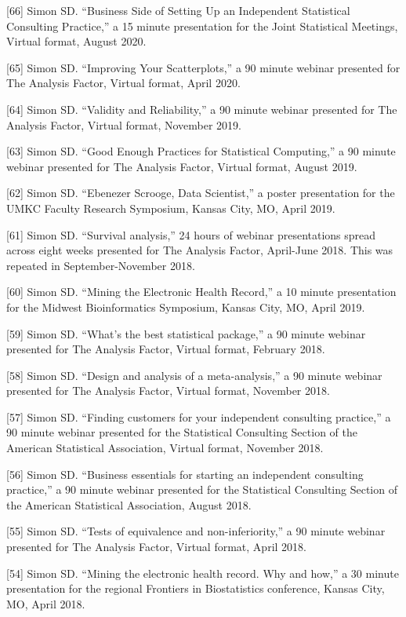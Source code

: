 \documentclass[
  12pt,
]{article}
\begin{document}
{[}66{]} Simon SD. ``Business Side of Setting Up an Independent
Statistical Consulting Practice,'' a 15 minute presentation for the
Joint Statistical Meetings, Virtual format, August 2020.

{[}65{]} Simon SD. ``Improving Your Scatterplots,'' a 90 minute webinar
presented for The Analysis Factor, Virtual format, April 2020.

{[}64{]} Simon SD. ``Validity and Reliability,'' a 90 minute webinar
presented for The Analysis Factor, Virtual format, November 2019.

{[}63{]} Simon SD. ``Good Enough Practices for Statistical Computing,''
a 90 minute webinar presented for The Analysis Factor, Virtual format,
August 2019.

{[}62{]} Simon SD. ``Ebenezer Scrooge, Data Scientist,'' a poster
presentation for the UMKC Faculty Research Symposium, Kansas City, MO,
April 2019.

{[}61{]} Simon SD. ``Survival analysis,'' 24 hours of webinar
presentations spread across eight weeks presented for The Analysis
Factor, April-June 2018. This was repeated in September-November 2018.

{[}60{]} Simon SD. ``Mining the Electronic Health Record,'' a 10 minute
presentation for the Midwest Bioinformatics Symposium, Kansas City, MO,
April 2019.

{[}59{]} Simon SD. ``What's the best statistical package,'' a 90 minute
webinar presented for The Analysis Factor, Virtual format, February
2018.

{[}58{]} Simon SD. ``Design and analysis of a meta-analysis,'' a 90
minute webinar presented for The Analysis Factor, Virtual format,
November 2018.

{[}57{]} Simon SD. ``Finding customers for your independent consulting
practice,'' a 90 minute webinar presented for the Statistical Consulting
Section of the American Statistical Association, Virtual format,
November 2018.

{[}56{]} Simon SD. ``Business essentials for starting an independent
consulting practice,'' a 90 minute webinar presented for the Statistical
Consulting Section of the American Statistical Association, August 2018.

{[}55{]} Simon SD. ``Tests of equivalence and non-inferiority,'' a 90
minute webinar presented for The Analysis Factor, Virtual format, April
2018.

{[}54{]} Simon SD. ``Mining the electronic health record. Why and how,''
a 30 minute presentation for the regional Frontiers in Biostatistics
conference, Kansas City, MO, April 2018.
\end{document}
